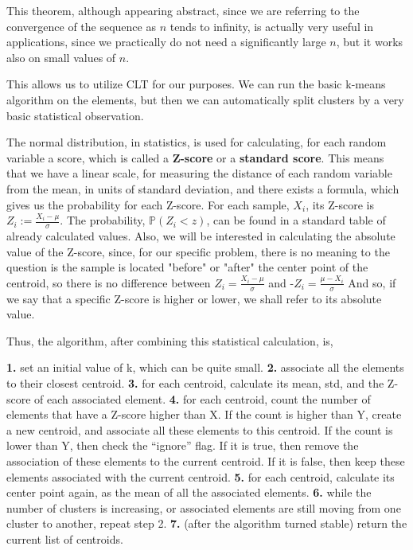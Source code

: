 \documentclass[12pt]{article}
\begin{document}
This theorem, although appearing abstract, since we are referring to the convergence of the sequence 
as $n$ tends to infinity, is actually very useful in applications, since we practically do not need a significantly large $n$, but it works also on small values of $n$.

This allows us to utilize CLT for our purposes. We can run the basic k-means algorithm on the elements, but then we can automatically split clusters by a very basic statistical observation.

The normal distribution, in statistics, is used for calculating, for each random variable a score, which is called a \textbf{Z-score} or a \textbf{standard score}. This means that we have a linear scale, for measuring the distance of each random variable from the mean, in units of standard deviation, and there exists a formula, which gives us the probability for each Z-score.
For each sample, $X_i$, its Z-score is $Z_i:=\frac{X_i-\mu}{\sigma}$. The probability, $\mathbb{P}(Z_i < z)$, can be found in a standard table of already calculated values. \newline
Also, we will be interested in calculating the absolute value of the Z-score, since, for our specific problem, there is no meaning to the question is the sample is located "before" or "after" the center point of the centroid, so there is no difference between $Z_i=\frac{X_i-\mu}{\sigma}$ and -$Z_i=\frac{\mu-X_i}{\sigma}$ \newline
And so, if we say that a specific Z-score is higher or lower, we shall refer to its absolute value. \newline

Thus, the algorithm, after combining this statistical calculation, is,

\textbf{1.} set an initial value of k, which can be quite small. \newline
\textbf{2.} associate all the elements to their closest centroid. \newline
\textbf{3.} for each centroid, calculate its mean, std, and the Z-score of each associated element. \newline
\textbf{4.} for each centroid, count the number of elements that have a Z-score higher than X. If the count is higher than Y, create a new centroid, and associate all these elements to this centroid.
If the count is lower than Y, then check the “ignore” flag. If it is true, then remove the association of these elements to the current centroid. If it is false, then keep these elements associated with the current centroid. \newline
\textbf{5.} for each centroid, calculate its center point again, as the mean of all the associated elements. \newline
\textbf{6.} while the number of clusters is increasing, or associated elements are still moving from one cluster to another, repeat step 2. \newline
\textbf{7.} (after the algorithm turned stable) return the current list of centroids. \newline
\end{document}
